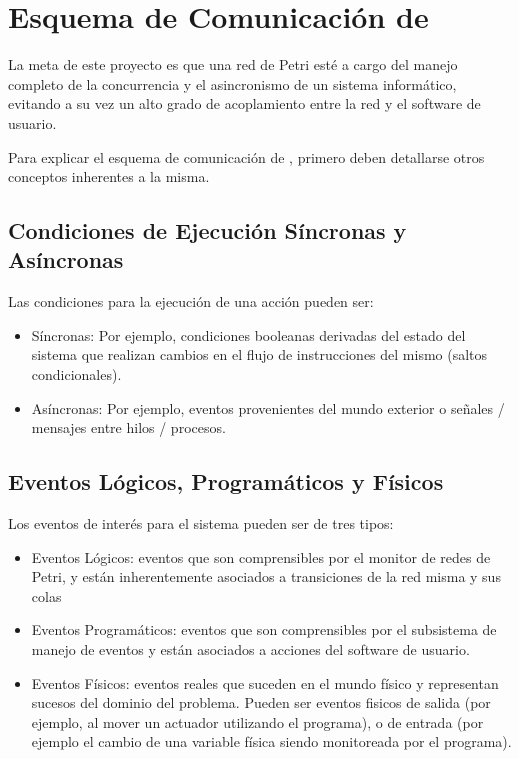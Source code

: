 \section{Esquema de Comunicación de \nombreFramework}
La meta de este proyecto es que una red de Petri esté a cargo del manejo
completo de la concurrencia y el asincronismo de un sistema informático,
evitando a su vez un alto grado de acoplamiento entre la red y el software de
usuario.

Para explicar el esquema de comunicación de \nombreFramework , primero deben
detallarse otros conceptos inherentes a la misma.


\subsection{Condiciones de Ejecución Síncronas y Asíncronas}
Las condiciones para la ejecución de una acción pueden ser:
  \begin{itemize}
	\item Síncronas: Por ejemplo, condiciones booleanas derivadas del estado del
		sistema que realizan cambios en el flujo de instrucciones del mismo (saltos
		condicionales).
	\item Asíncronas: Por ejemplo, eventos provenientes del mundo exterior o
		señales / mensajes entre hilos / procesos.
  \end{itemize}
  
\subsection{Eventos Lógicos, Programáticos y Físicos}
Los eventos de interés para el sistema pueden ser de tres tipos:
  \begin{itemize}
    \item Eventos Lógicos: eventos que son comprensibles por el monitor de
    redes de Petri, y están inherentemente asociados a transiciones de la red
    misma y sus colas
    \item Eventos Programáticos: eventos que son comprensibles por el
    subsistema de manejo de eventos y están asociados a acciones del
    software de usuario.
    \item Eventos Físicos: eventos reales que suceden en el mundo físico y
    representan sucesos del dominio del problema. Pueden ser eventos fisicos de
    salida (por ejemplo, al mover un actuador utilizando el programa), o de
    entrada (por ejemplo el cambio de una variable física siendo monitoreada por
    el programa).
  \end{itemize}
  
